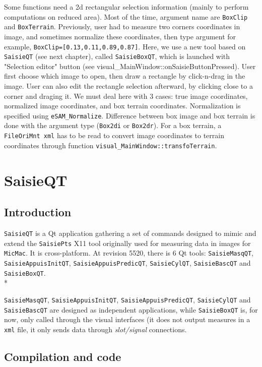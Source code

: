 \documentclass[a4paper]{book}
\begin{document}
Some functions need a 2d rectangular selection information (mainly to perform computations on reduced area). Most of the time, argument name are {\tt BoxClip} and {\tt BoxTerrain}. Previously, user had to measure two corners coordinates in image, and sometimes normalize these coordinates, then type argument for example, {\tt BoxClip=[0.13,0.11,0.89,0.87]}. Here, we use a new tool based on {\tt SaisieQT} (see next chapter), called {\tt SaisieBoxQT}, which is launched with "Selection editor" button (see visual\_MainWindow::onSaisieButtonPressed). User first choose which image to open, then draw a rectangle by click-n-drag in the image. User can also edit the rectangle selection afterward, by clicking close to a corner and draging it.
We must deal here with 3 cases: true image coordinates, normalized image coordinates, and box terrain coordinates.
Normalization is specified using {\tt eSAM\_Normalize}. Difference between box image and box terrain is done with the argument type ({\tt Box2di} or {\tt Box2dr}). For a box terrain, a {\tt FileOriMnt xml} has to be read to convert image coordinates to terrain coordinates through function {\tt visual\_MainWindow::transfoTerrain}.

\section{SaisieQT}

\subsection{Introduction}

{\tt SaisieQT} is a Qt application gathering a set of commands designed to mimic and extend the {\tt SaisiePts} X11 tool originally used for measuring data in images for {\tt MicMac}. It is cross-platform.
At revision 5520, there is 6 Qt tools: {\tt SaisieMasqQT}, {\tt SaisieAppuisInitQT}, {\tt SaisieAppuisPredicQT}, {\tt SaisieCylQT}, {\tt SaisieBascQT} and {\tt SaisieBoxQT}.\\*

{\tt SaisieMasqQT}, {\tt SaisieAppuisInitQT}, {\tt SaisieAppuisPredicQT}, {\tt SaisieCylQT} and {\tt SaisieBascQT} are designed as independent applications, while {\tt SaisieBoxQT} is, for now, only called through the visual interfaces (it does not output measures in a {\tt xml} file, it only sends data through \textit{slot/signal} connections.

\subsection{Compilation and code}
\end{document}
